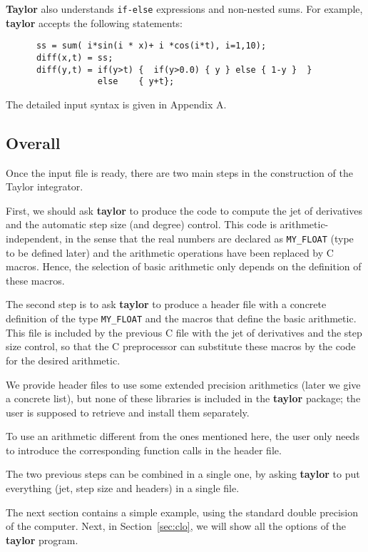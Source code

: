 \documentclass{article}
\begin{document}
{\bf Taylor} also understands {\tt if-else}
expressions and non-nested sums. For example,
{\bf taylor} accepts the following statements:
\begin{verbatim}
      ss = sum( i*sin(i * x)+ i *cos(i*t), i=1,10);
      diff(x,t) = ss;
      diff(y,t) = if(y>t) {  if(y>0.0) { y } else { 1-y }  }
                  else    { y+t};
\end{verbatim}

The detailed input syntax is given in Appendix A.

\subsection{Overall}
Once the input file is ready, there are two main steps in the
construction of the Taylor integrator.

First, we should ask {\bf taylor} to produce the code to compute the
jet of derivatives and the automatic step size (and degree)
control. This code is arithmetic-independent, in the sense that the
real numbers are declared as {\tt MY\_FLOAT} (type to be defined
later) and the arithmetic operations have been replaced by C
macros. Hence, the selection of basic arithmetic only depends on the
definition of these macros.

The second step is to ask {\bf taylor} to produce a header file with a
concrete definition of the type {\tt MY\_FLOAT} and the macros that
define the basic arithmetic. This file is included by the previous C
file with the jet of derivatives and the step size control, so that
the C preprocessor can substitute these macros by the code for
the desired arithmetic.

We provide header files to use
some extended precision arithmetics (later we give a concrete list),
but none of these libraries is included in the {\bf taylor} package;
the user is supposed to retrieve and install them separately.

To use an arithmetic different from the ones mentioned here, the user
only needs to introduce the corresponding function calls in the header
file.

The two previous steps can be combined in a single one, by asking {\bf
taylor} to put everything (jet, step size and headers) in a single
file.

The next section contains a simple example, using the standard
double precision of the computer. Next, in Section~\ref{sec:clo}, we
will show all the options of the {\bf taylor} program.
\end{document}
